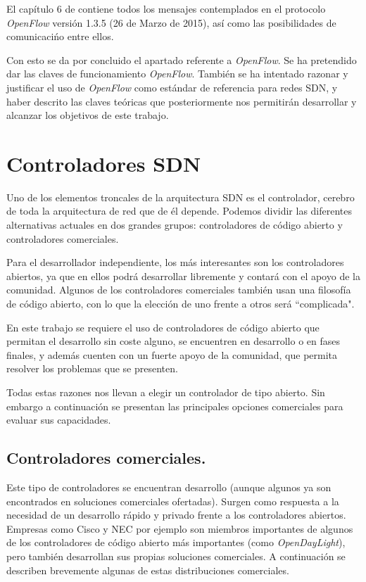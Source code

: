\documentclass[a4paper,11pt]{book}
\begin{document}
El capítulo 6 de \cite{openflow13} contiene todos los mensajes contemplados en el protocolo \emph{OpenFlow} versión 1.3.5 (26 de Marzo de 2015), así como las posibilidades de comunicacińo entre ellos.

Con esto se da por concluido el apartado referente a \emph{OpenFlow}. Se ha pretendido dar las claves de funcionamiento \emph{OpenFlow}. También se ha intentado razonar y justificar el uso de \emph{OpenFlow} como estándar de referencia para redes \ac{SDN}, y haber descrito las claves teóricas que posteriormente nos permitirán desarrollar y alcanzar los objetivos de este trabajo.


\section{Controladores \ac{SDN}}
Uno de los elementos troncales de la arquitectura \ac{SDN} es el controlador, cerebro de toda la arquitectura de red que de él depende. Podemos dividir las diferentes alternativas actuales en dos grandes grupos: controladores de código abierto y controladores comerciales. 

Para el desarrollador independiente, los más interesantes son los controladores abiertos, ya que en ellos podrá desarrollar libremente y contará con el apoyo de la comunidad. Algunos de los controladores comerciales también usan una filosofía de código abierto, con lo que la elección de uno frente a otros será ``complicada".

En este trabajo se requiere el uso de controladores de código abierto que permitan el desarrollo sin coste alguno, se encuentren en desarrollo o en fases finales, y además cuenten con un fuerte apoyo de la comunidad, que permita resolver los problemas que se presenten.

Todas estas razones nos llevan a elegir un controlador de tipo abierto. Sin embargo a continuación se presentan las principales opciones comerciales para evaluar sus capacidades.

\subsection{Controladores comerciales.} 
Este tipo de controladores se encuentran desarrollo (aunque algunos ya son encontrados en soluciones comerciales ofertadas). Surgen como respuesta a la necesidad de un desarrollo rápido y privado frente a los controladores abiertos. Empresas como Cisco y NEC por ejemplo son miembros importantes de algunos de los controladores de código abierto más importantes (como \emph{OpenDayLight}), pero también desarrollan sus propias soluciones comerciales. A continuación se describen brevemente algunas de estas distribuciones comerciales.
\end{document}
